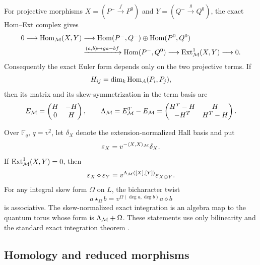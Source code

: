 For projective morphisms
$X=(P^-\xrightarrow fP^0)$ and
$Y=(Q^-\xrightarrow gQ^0)$, the exact Hom--Ext complex gives
\begin{equation}
\begin{aligned}
0\longrightarrow\operatorname{Hom}_{\mathcal M}(X,Y)
&\longrightarrow
 \operatorname{Hom}(P^-,Q^-)\oplus\operatorname{Hom}(P^0,Q^0)\\
&\xrightarrow{(a,b)\mapsto ga-bf}
 \operatorname{Hom}(P^-,Q^0)
 \longrightarrow\operatorname{Ext}^1_{\mathcal M}(X,Y)\longrightarrow0.
\end{aligned}
\label{eq:hom-ext-complex}
\end{equation}
Consequently the exact Euler form depends only on the two projective terms.
If
\[
 H_{ij}=\dim_k\operatorname{Hom}_A(P_i,P_j),
\]
then its matrix and its skew-symmetrization in the term basis are
\begin{equation}
 E_{\mathcal M}=
 \begin{pmatrix}H&-H\\0&H\end{pmatrix},
 \qquad
 \Lambda_{\mathcal M}=E_{\mathcal M}^T-E_{\mathcal M}
 =\begin{pmatrix}
 H^T-H&H\\-H^T&H^T-H
 \end{pmatrix}.
 \label{eq:exact-euler-skew}
\end{equation}

Over $\mathbb F_q$, $q=v^2$, let $\delta_X$ denote the
extension-normalized Hall basis and put
\[
 \varepsilon_X=v^{-\langle X,X\rangle_{\mathcal M}}\delta_X.
\]
If $\operatorname{Ext}^1_{\mathcal M}(X,Y)=0$, then
\begin{equation}
 \varepsilon_X\diamond\varepsilon_Y
 =v^{\Lambda_{\mathcal M}([X],[Y])}\varepsilon_{X\oplus Y}.
 \label{eq:split-Hall}
\end{equation}
For any integral skew form $\Omega$ on $L$, the bicharacter twist
\begin{equation}
 a\star_\Omega b
 =v^{\Omega(\deg a,\deg b)}a\diamond b
 \label{eq:Hall-twist}
\end{equation}
is associative.  The skew-normalized exact integration is an algebra map to
the quantum torus whose form is $\Lambda_{\mathcal M}+\Omega$.  These statements use
only bilinearity and the standard exact integration theorem
\cite{ZhangFixedSize}.

\subsection{Homology and reduced morphisms}

